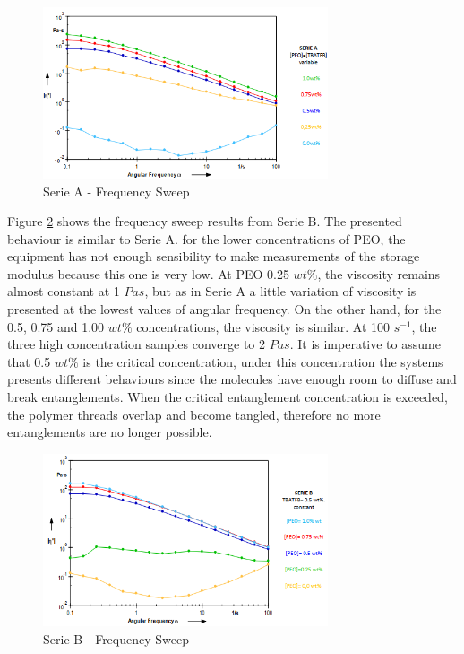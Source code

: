 \begin{figure}[th]
\centering
\includegraphics[width=0.75\textwidth]{./Figures/SerieAfreqSweep.png}
\decoRule
\caption[Serie A - Frequency Sweep]{Serie A - Frequency Sweep}
\label{fig:SerieAfreqSweep}
\end{figure}

Figure \ref{fig:SerieBfreqSweep} shows the frequency sweep results from Serie B. The presented behaviour is similar to Serie A. for the lower concentrations of PEO, the equipment has not enough sensibility to make measurements of the storage modulus because this one is very low. At PEO 0.25 $w t \%$, the viscosity remains almost constant at 1 $Pa s$, but as in Serie A a little variation of viscosity is presented at the lowest values of angular frequency. On the other hand, for the 0.5, 0.75 and 1.00 $w t \%$ concentrations, the viscosity is similar. At 100 $s^{-1}$, the three high concentration samples converge to 2 $Pa s$. It is imperative to assume that 0.5 $w t \%$ is the critical concentration, under this concentration the systems presents different behaviours since the molecules have enough room to diffuse and break entanglements. When the critical entanglement concentration is exceeded, the polymer threads overlap and become tangled, therefore no more entanglements are no longer possible.

\begin{figure}[th]
\centering
\includegraphics[width=0.75\textwidth]{./Figures/SerieBfreqSweep.png}
\decoRule
\caption[Serie B - Frequency Sweep]{Serie B - Frequency Sweep}
\label{fig:SerieBfreqSweep}
\end{figure}

